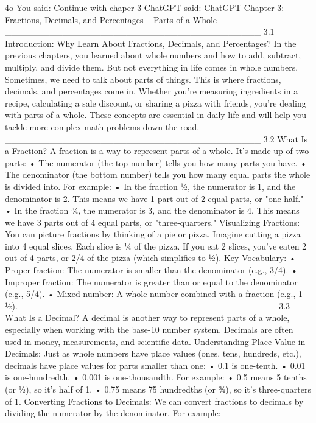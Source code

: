 4o
You said:
Continue with chaper 3
ChatGPT said:
ChatGPT
Chapter 3: Fractions, Decimals, and Percentages – Parts of a Whole
________________________________________
3.1 Introduction: Why Learn About Fractions, Decimals, and Percentages?
In the previous chapters, you learned about whole numbers and how to add, subtract, multiply, and divide them. But not everything in life comes in whole numbers. Sometimes, we need to talk about parts of things. This is where fractions, decimals, and percentages come in.
Whether you’re measuring ingredients in a recipe, calculating a sale discount, or sharing a pizza with friends, you’re dealing with parts of a whole. These concepts are essential in daily life and will help you tackle more complex math problems down the road.
________________________________________
3.2 What Is a Fraction?
A fraction is a way to represent parts of a whole. It’s made up of two parts:
•	The numerator (the top number) tells you how many parts you have.
•	The denominator (the bottom number) tells you how many equal parts the whole is divided into.
For example:
•	In the fraction ½, the numerator is 1, and the denominator is 2. This means we have 1 part out of 2 equal parts, or "one-half."
•	In the fraction ¾, the numerator is 3, and the denominator is 4. This means we have 3 parts out of 4 equal parts, or "three-quarters."
Visualizing Fractions: You can picture fractions by thinking of a pie or pizza. Imagine cutting a pizza into 4 equal slices. Each slice is ¼ of the pizza. If you eat 2 slices, you’ve eaten 2 out of 4 parts, or 2/4 of the pizza (which simplifies to ½).
Key Vocabulary:
•	Proper fraction: The numerator is smaller than the denominator (e.g., 3/4).
•	Improper fraction: The numerator is greater than or equal to the denominator (e.g., 5/4).
•	Mixed number: A whole number combined with a fraction (e.g., 1 ½).
________________________________________
3.3 What Is a Decimal?
A decimal is another way to represent parts of a whole, especially when working with the base-10 number system. Decimals are often used in money, measurements, and scientific data.
Understanding Place Value in Decimals: Just as whole numbers have place values (ones, tens, hundreds, etc.), decimals have place values for parts smaller than one:
•	0.1 is one-tenth.
•	0.01 is one-hundredth.
•	0.001 is one-thousandth.
For example:
•	0.5 means 5 tenths (or ½), so it’s half of 1.
•	0.75 means 75 hundredths (or ¾), so it’s three-quarters of 1.
Converting Fractions to Decimals: We can convert fractions to decimals by dividing the numerator by the denominator. For example:
